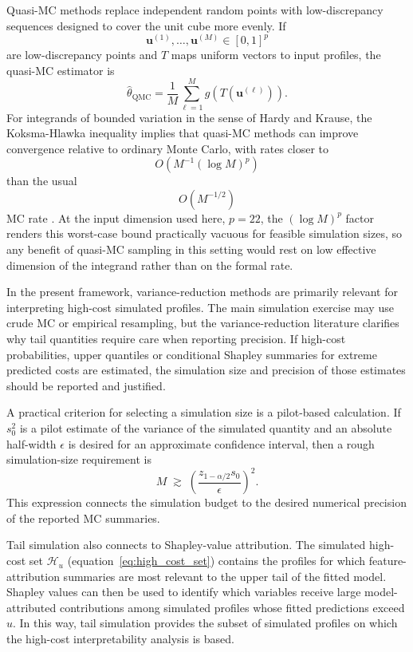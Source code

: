 \noindent
Quasi-MC methods replace independent random points with
low-discrepancy sequences designed to cover the unit cube more evenly. If
\[
    \mathbf{u}^{(1)},\ldots,\mathbf{u}^{(M)}
    \in
    [0,1]^p
\]
are low-discrepancy points and \(T\) maps uniform vectors to input profiles, the
quasi-MC estimator is
\[
    \widehat{\theta}_{\mathrm{QMC}}
    =
    \frac{1}{M}
    \sum_{\ell=1}^{M}
    g
    \!\left(
        T
        \!\left(
            \mathbf{u}^{(\ell)}
        \right)
    \right).
\]
For integrands of bounded variation in the sense of Hardy and Krause, the
Koksma-Hlawka inequality implies that
quasi-MC methods can improve convergence relative to ordinary Monte
Carlo, with rates closer to
\[
    O
    \!\left(
        M^{-1}
        (\log M)^p
    \right)
\]
than the usual
\[
    O
    \!\left(
        M^{-1/2}
    \right)
\]
MC rate \citep{caflisch1998monte,lemieux2009monte,owen2013monte}.
At the input dimension used here, \(p=22\), the \((\log M)^{p}\) factor
renders this worst-case bound practically vacuous for feasible simulation
sizes, so any benefit of quasi-MC sampling in this setting would rest
on low effective dimension of the integrand rather than on the formal rate.

\noindent
In the present framework, variance-reduction methods are primarily relevant for
interpreting high-cost simulated profiles. The main simulation exercise may use
crude MC or empirical resampling, but the variance-reduction literature
clarifies why tail quantities require care when reporting precision. If
high-cost probabilities, upper quantiles or conditional Shapley summaries for
extreme predicted costs are estimated, the simulation size and precision of
those estimates should be reported and justified.

\noindent
A practical criterion for selecting a simulation size is a pilot-based
calculation. If \(s_0^2\) is a pilot estimate of the variance of the simulated
quantity and an absolute half-width \(\epsilon\) is desired for an approximate
confidence interval, then a rough simulation-size requirement is
\[
    M
    \;\gtrsim\;
    \left(
        \frac{
            z_{1-\alpha/2}s_0
        }{
            \epsilon
        }
    \right)^2.
\]
This expression connects the simulation budget to the desired numerical
precision of the reported MC summaries.

\noindent
Tail simulation also connects to Shapley-value
attribution. The simulated high-cost set \(\mathcal{H}_{u}\)
(equation~\eqref{eq:high_cost_set}) contains the profiles for which
feature-attribution summaries are most relevant to the upper tail of the fitted
model. Shapley values can then be used to identify which variables receive large
model-attributed contributions among simulated profiles whose fitted predictions
exceed \(u\). In this way, tail simulation provides the subset of simulated
profiles on which the high-cost interpretability analysis is based.


